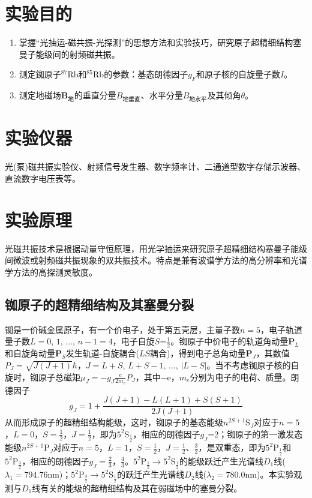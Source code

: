 \documentclass[a4paper]{article}
\begin{document}
\section{实验目的}
\begin{enumerate}
\item 掌握“光抽运-磁共振-光探测”的思想方法和实验技巧，研究原子超精细结构塞曼子能级间的射频磁共振。
\item 测定銣原子$^{87}$Rb和$^{85}$Rb的参数：基态朗德因子$g_F$和原子核的自旋量子数$I$。
\item 测定地磁场$\bm{B}_\text{地}$的垂直分量$B_{\text{地垂直}}$、水平分量$B_{\text{地水平}}$及其倾角$\theta$。
\end{enumerate}

\section{实验仪器}
光(泵)磁共振实验仪、射频信号发生器、数字频率计、二通道型数字存储示波器、直流数字电压表等。

\section{实验原理}
光磁共振技术是根据动量守恒原理，用光学抽运来研究原子超精细结构塞曼子能级间微波或射频磁共振现象的双共振技术。特点是兼有波谱学方法的高分辨率和光谱学方法的高探测灵敏度。
\subsection{铷原子的超精细结构及其塞曼分裂}
铷是一价碱金属原子，有一个价电子，处于第五壳层，主量子数$n=5$，电子轨道量子数$L=0$, $1$, $\dots$, $n-1=4$，电子自旋$S$=$\frac{1}{2}$。铷原子中价电子的轨道角动量$\bm{P}_L$和自旋角动量$\bm{P}_S$发生轨道-自旋耦合($LS$耦合)，得到电子总角动量$\bm{P}_J$，其数值$P_J = \sqrt{J(J+1)}\hbar$，$J=L+S$, $L+S-1$, $\dots$, $|L-S|$。当不考虑铷原子核的自旋时，铷原子总磁矩$\mu_J = -g_J\frac{e}{2m_e}P_J$，其中$-$e，$m_e$分别为电子的电荷、质量。朗德因子
\begin{equation}
g_J = 1+\frac{J(J+1)- L(L+1)+ S(S+1)}{2J(J+1)}\label{eq1}
\end{equation}
从而形成原子的超精细结构能级，这时，铷原子的基态能级$n^{2S+1}\text{S}_J$对应于$n=5$，$L=0$，$S=\frac{1}{2}$，$J=\frac{1}{2}$，即为$5^2\text{S}_{\frac{1}{2}}$，相应的朗德因子$g_J$=2；铷原子的第一激发态能级$n^{2S+1}\text{P}_J$对应于$n=5$，$L=1$，$S=\frac{1}{2}$，$J=\frac{1}{2}$、$\frac{3}{2}$，是双重态，即为$5^2\text{P}_{\frac{1}{2}}$和$5^2\text{P}_{\frac{3}{2}}$，相应的朗德因子$g_J=\frac{2}{3}$，$\frac{4}{3}$。$5^2\text{P}_{\frac{1}{2}}\to 5^2\text{S}_{\frac{1}{2}}$的能级跃迁产生光谱线$D_1$线($\lambda_1=794.76$nm)；$5^2\text{P}_{\frac{3}{2}}\to 5^2\text{S}_{\frac{1}{2}}$的跃迁产生光谱线$D_2$线($\lambda_2=780.0$nm)。本实验观测与$D_1$线有关的能级的超精细结构及其在弱磁场中的塞曼分裂。
\end{document}
